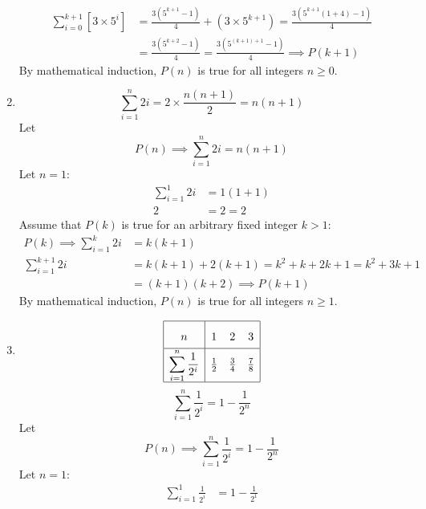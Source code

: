 \documentclass[12pt, A4]{article}
\begin{document}
\begin{enumerate}
\begin{align*}
								\sum_{i = 0}^{k + 1}\left[3 \times 5^i\right] &= \frac{3\left(5^{k + 1} - 1\right)}{4} + \left(3 \times 5^{k + 1}\right)
										= \frac{3\left(5^{k + 1}\left(1 + 4\right) - 1\right)}{4} \\
									&= \frac{3\left(5^{k + 2} - 1\right)}{4}
											= \frac{3\left(5^{(k + 1) + 1} - 1\right)}{4} 
											\implies P(k + 1)
							\end{align*}
							By mathematical induction, \(P(n)\) is true for all integers \(n \ge 0\).
					\setcounter{enumi}{8}
					\item
						\begin{tasks}
							\task
								\[\sum_{i = 1}^n 2i = 2 \times \frac{n(n + 1)}{2} = n(n + 1)\]
							\task
								Let
									\[P(n) \implies \sum_{i = 1}^n 2i = n(n + 1)\]
									Let \(n = 1\):
									\begin{align*}
										\sum_{i = 1}^1 2i &= 1(1 + 1) \\
										2 &= 2 = 2
									\end{align*}
									Assume that \(P(k)\) is true for an arbitrary fixed integer \(k > 1\):
									\begin{align*}
										P(k) \implies \sum_{i = 1}^k 2i &= k(k + 1) \\
										\sum_{i = 1}^{k + 1} 2i &= k(k + 1) + 2(k + 1) 
												= k^2 + k + 2k + 1
												= k^2 + 3k + 1 \\
											&= (k + 1)(k + 2) \implies P(k + 1)
									\end{align*}
									By mathematical induction, \(P(n)\) is true for all integers \(n \ge 1\).
						\end{tasks}
					\setcounter{enumi}{10}
					\item
						\begin{tasks}
							\task
								\[\def\arraystretch{2}\begin{array}{|c|ccc|}\hline
									n & 1 & 2 & 3 \\\hline
									\displaystyle \sum_{i = 1}^n \frac{1}{2^i} & \frac{1}{2} & \frac{3}{4} & \frac{7}{8} \\\hline
								\end{array}\]
								\[\sum_{i = 1}^n \frac{1}{2^i} = 1 - \frac{1}{2^n}\]
							\task
								Let
									\[P(n) \implies \sum_{i = 1}^n \frac{1}{2^i} = 1 - \frac{1}{2^n}\]
									Let \(n = 1\):
									\begin{align*}
										\sum_{i = 1}^1 \frac{1}{2^i} &= 1 - \frac{1}{2^1} \\

\end{align*}
\end{tasks}
\end{enumerate}
\end{document}
